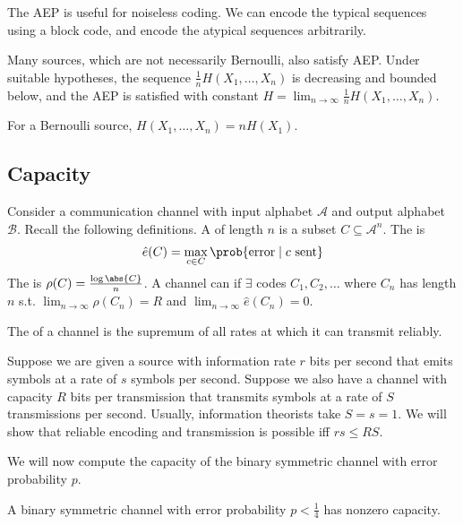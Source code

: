 \begin{remark}
    The AEP is useful for noiseless coding.
    We can encode the typical sequences using a block code, and encode the atypical sequences arbitrarily.

    Many sources, which are not necessarily Bernoulli, also satisfy AEP.
    Under suitable hypotheses, the sequence $\frac{1}{n} H(X_1, \dots, X_n)$ is decreasing and bounded below, and the AEP is satisfied with constant $H = \lim_{n \to \infty} \frac{1}{n} H(X_1, \dots, X_n)$.

    For a Bernoulli source, $H(X_1, \dots, X_n) = n H(X_1)$.
\end{remark}

\subsection{Capacity}
Consider a communication channel with input alphabet $\mathcal A$ and output alphabet $\mathcal B$.
Recall the following definitions.
A  of length $n$ is a subset $C \subseteq \mathcal A^n$.
The  is
\begin{align*}
        \hat e(C) = \max_{c \in C} \prob{\text{error} \mid c \text{ sent}}
    \end{align*}
The  is $\rho(C) = \frac{\log \abs{C}}{n}$.
A channel can  if $\exists$ codes $C_1, C_2, \dots$ where $C_n$ has length $n$ s.t. $\lim_{n \to \infty} \rho(C_n) = R$ and $\lim_{n \to \infty} \hat e(C_n) = 0$.

\begin{definition}
    The  of a channel is the supremum of all rates at which it can transmit reliably.
\end{definition}

Suppose we are given a source with information rate $r$ bits per second that emits symbols at a rate of $s$ symbols per second.
Suppose we also have a channel with capacity $R$ bits per transmission that transmits symbols at a rate of $S$ transmissions per second.
Usually, information theorists take $S = s = 1$.
We will show that reliable encoding and transmission is possible iff $rs \leq RS$.

We will now compute the capacity of the binary symmetric channel with error probability $p$.

\begin{proposition}
    A binary symmetric channel with error probability $p < \frac{1}{4}$ has nonzero capacity.
\end{proposition}

